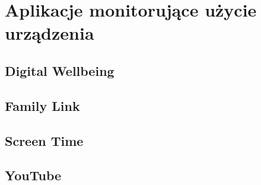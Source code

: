 \section{Aplikacje monitorujące użycie urządzenia}

\subsection{Digital Wellbeing}

\subsection{Family Link}

\subsection{Screen Time}

\subsection{YouTube}
